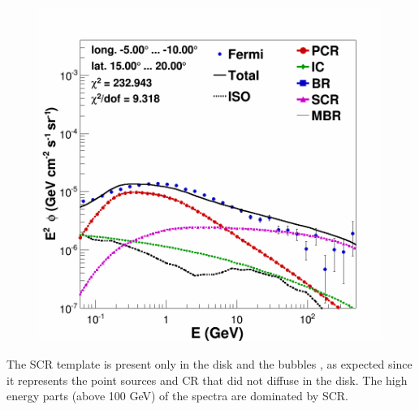 \begin{figure}[h]
\begin{minipage}[h]{0.45\textwidth}
	  \includegraphics[width=1.\linewidth]{pic/results/SCRonly_spectra_bubble_example.png}
	  \label{fig:BKGonly_bubble_spec}
  \end{minipage}	 
\end{figure}

The SCR template is present only in the disk and the bubbles , as expected since it represents the point sources and CR that did not diffuse in the disk. The high energy parts (above 100 GeV) of the spectra are dominated by SCR.







